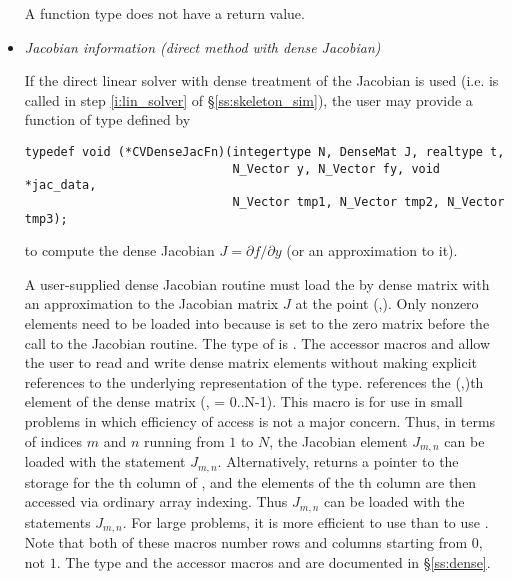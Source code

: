 \begin{itemize}
   A  function type does not have a return value.
%
%
\item {\em Jacobian information (direct method with dense Jacobian)}
  \label{p:djac}
  
  If the direct linear solver with dense treatment of the Jacobian is used 
  (i.e.  is called in step \ref{i:lin_solver} of \S\ref{ss:skeleton_sim}), 
  the user may provide a function of type  defined by
\begin{verbatim}
typedef void (*CVDenseJacFn)(integertype N, DenseMat J, realtype t, 
                             N_Vector y, N_Vector fy, void *jac_data,
                             N_Vector tmp1, N_Vector tmp2, N_Vector tmp3);
\end{verbatim}
  to compute the dense Jacobian $J = \partial f / \partial y$ (or an approximation to it).
  
  A user-supplied dense Jacobian routine must load the  by 
  dense matrix  with an approximation to the Jacobian matrix $J$
  at the point (,).  Only nonzero elements need to be loaded
  into  because  is set to the zero matrix before the call
  to the Jacobian routine. The type of  is . The
  accessor macros  and  allow the user to
  read and write dense matrix elements without making explicit
  references to the underlying representation of the 
  type.  references the (,)th
  element of the dense matrix  (, = 0..N-1). This macro
  is for use in small problems in which efficiency of access is not a major
  concern.  Thus, in terms of indices $m$ and $n$ running from $1$ to
  $N$, the Jacobian element $J_{m,n}$ can be loaded with the statement
   $J_{m,n}$.  Alternatively,
   returns a pointer to the storage for
  the th column of , and the elements of the th column
  are then accessed via ordinary array indexing.  Thus $J_{m,n}$ can be 
  loaded with the statements 
   $J_{m,n}$.  For large problems, it is more 
  efficient to use  than to use . 
  Note that both of these macros number rows and columns
  starting from $0$, not $1$.  The  type and the accessor
  macros  and  are documented in
  \S\ref{ss:dense}.
  

\end{itemize}
